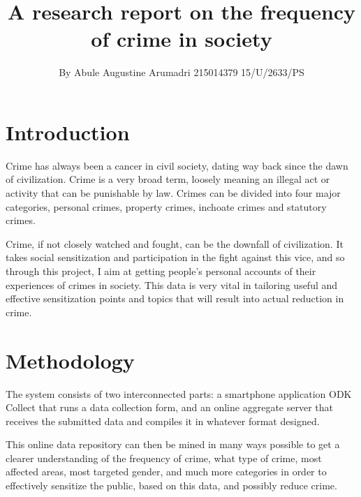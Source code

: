 \documentclass{article}
\title{A research report on the frequency of crime in society}
\author{By Abule Augustine Arumadri 215014379 15/U/2633/PS}
\date{}
\begin{document}
\maketitle
\tableofcontents
\section{Introduction}
Crime  has always been a cancer in civil society, dating way back since the dawn of civilization. 
Crime is a very broad term, loosely meaning an illegal act or activity that can be punishable by law. Crimes can be divided into four major categories, personal crimes, property crimes, inchoate crimes and statutory crimes.

Crime, if not closely watched and fought, can be the downfall of civilization. It takes social sensitization and participation in the fight against this vice, and so through this project, I aim at getting people's personal accounts of their experiences of crimes in society. This data is very vital in tailoring useful and effective sensitization points and topics that will result into actual reduction in crime.


\section{Methodology}
The system consists of two interconnected parts: a smartphone application ODK Collect \cite{key:2} that runs a data collection form, and an online aggregate
 server that receives the submitted data and compiles it in whatever format designed. 

This online data repository can then be mined in many ways possible to get a clearer understanding of the frequency of crime,
 what type of crime, most affected areas, most targeted gender, and much more categories in order to effectively sensitize the public, 
based on this data, and possibly reduce crime.
\end{document}
